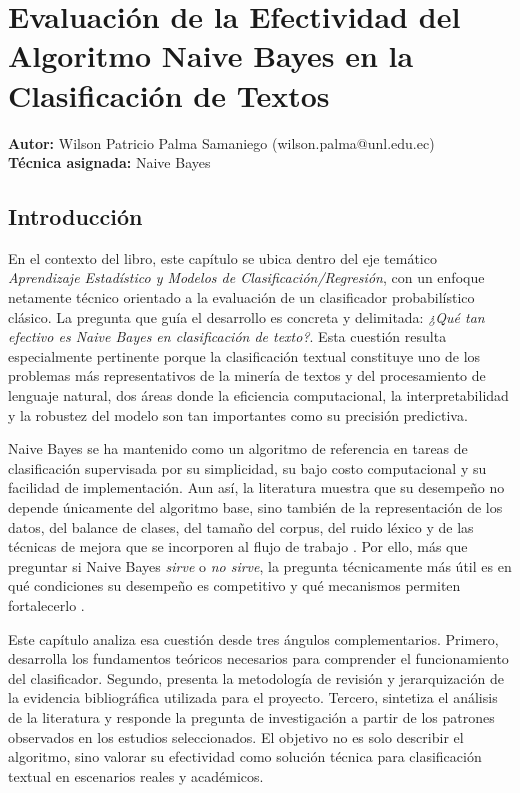 
\chapter{Evaluación de la Efectividad del Algoritmo Naive Bayes en la Clasificación de Textos}
\label{cap:capitulo_04}

\textbf{Autor:} Wilson Patricio Palma Samaniego (wilson.palma@unl.edu.ec) \\
\textbf{Técnica asignada:} Naive Bayes \\

\section{Introducción}

En el contexto del libro, este capítulo se ubica dentro del eje temático \textit{Aprendizaje Estadístico y Modelos de Clasificación/Regresión}, con un enfoque netamente técnico orientado a la evaluación de un clasificador probabilístico clásico. La pregunta que guía el desarrollo es concreta y delimitada: \textit{¿Qué tan efectivo es Naive Bayes en clasificación de texto?}. Esta cuestión resulta especialmente pertinente porque la clasificación textual constituye uno de los problemas más representativos de la minería de textos y del procesamiento de lenguaje natural, dos áreas donde la eficiencia computacional, la interpretabilidad y la robustez del modelo son tan importantes como su precisión predictiva.

Naive Bayes se ha mantenido como un algoritmo de referencia en tareas de clasificación supervisada por su simplicidad, su bajo costo computacional y su facilidad de implementación. Aun así, la literatura muestra que su desempeño no depende únicamente del algoritmo base, sino también de la representación de los datos, del balance de clases, del tamaño del corpus, del ruido léxico y de las técnicas de mejora que se incorporen al flujo de trabajo \cite{Kim2006,Frank2006,Kibriya2005}. Por ello, más que preguntar si Naive Bayes \textit{sirve} o \textit{no sirve}, la pregunta técnicamente más útil es en qué condiciones su desempeño es competitivo y qué mecanismos permiten fortalecerlo \cite{Jiang2016,10.1145/2911451.2911547}.

Este capítulo analiza esa cuestión desde tres ángulos complementarios. Primero, desarrolla los fundamentos teóricos necesarios para comprender el funcionamiento del clasificador. Segundo, presenta la metodología de revisión y jerarquización de la evidencia bibliográfica utilizada para el proyecto. Tercero, sintetiza el análisis de la literatura y responde la pregunta de investigación a partir de los patrones observados en los estudios seleccionados. El objetivo no es solo describir el algoritmo, sino valorar su efectividad como solución técnica para clasificación textual en escenarios reales y académicos.

